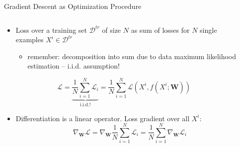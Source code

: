 \begin{frame}{Gradient Descent as Optimization Procedure}
\protect\hypertarget{gradient-descent-as-optimization-procedure}{}
\begin{columns}[T]
\begin{column}{0.4\textwidth}
\begin{itemize}
\tightlist
\item
  Loss over a training set \(\mathcal{D}^{tr}\) of size \(N\) as sum of
  losses for \(N\) single examples \(X^i \in \mathcal{D}^{tr}\)

  \begin{itemize}
  \tightlist
  \item
    remember: decomposition into sum due to data maximum likelihood
    estimation -- i.i.d. assumption!
  \end{itemize}
\end{itemize}

\[ \mathcal{L} = \underbrace{\dfrac{1}{N} {\displaystyle \sum_{i=1}^{N} \mathcal{L}_i}}_{\text{i.i.d.!}} = \dfrac{1}{N} {\displaystyle \sum_{i=1}^{N} \mathcal{L}(X^i, f(X^i;\mathbf{W}))} \]

\begin{itemize}
\tightlist
\item
  Differentiation is a linear operator. Loss gradient over all \(X^i\):
  \[ \nabla_\mathbf{W} \mathcal{L} = \nabla_\mathbf{W} \dfrac{1}{N} {\displaystyle \sum_{i=1}^{N} \mathcal{L}_i} = \dfrac{1}{N} {\displaystyle \sum_{i=1}^{N} \nabla_\mathbf{W} \mathcal{L}_i} \]
\end{itemize}
\end{column}

\begin{column}{0.6\textwidth}
\end{column}
\end{columns}
\end{frame}

